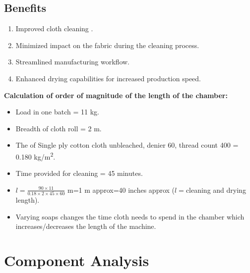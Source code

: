 \documentclass[table,french,english]{rapportCS}
\begin{document}
\subsection{Benefits}
\begin{enumerate}[label=$\bullet$]
    \item Improved cloth cleaning .
    \item Minimized impact on the fabric during the cleaning process.
    \item Streamlined manufacturing workflow.
    \item Enhanced drying capabilities for increased production speed.
\end{enumerate}
\textbf{Calculation of order of magnitude of the length of the chamber:}
\begin{itemize}[label=$\bullet$]
    \item Load in one batch = 11 kg.
    \item Breadth of cloth roll = 2 m.
    \item The   of Single ply cotton cloth unbleached, denier 60, thread count 400 = 0.180 kg/m\textsuperscript{2}.
    \item Time provided for cleaning = 45 minutes.
    \item \( l = \frac{90 \times 11}{0.18 \times 2 \times 45 \times 60} \) m=1 m approx=40 inches approx (\(l=\)cleaning and drying length).
    \item Varying soaps changes the time cloth needs to spend in the chamber which increases/decreases the length of the machine.

\end{itemize}


\section{Component Analysis}\label{sec:compana}
\end{document}
